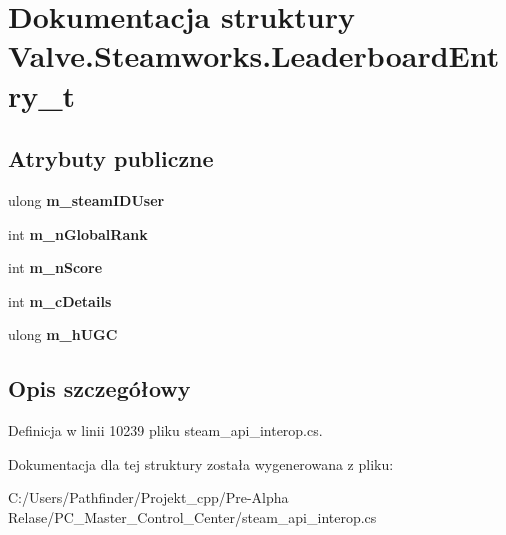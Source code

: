 \hypertarget{struct_valve_1_1_steamworks_1_1_leaderboard_entry__t}{}\section{Dokumentacja struktury Valve.\+Steamworks.\+Leaderboard\+Entry\+\_\+t}
\label{struct_valve_1_1_steamworks_1_1_leaderboard_entry__t}
\subsection*{Atrybuty publiczne}
\begin{DoxyCompactItemize}
\item 
\mbox{\label{struct_valve_1_1_steamworks_1_1_leaderboard_entry__t_a521bb9e594ff1fe1141b824491a4f9cb}} 
ulong {\bfseries m\+\_\+steam\+I\+D\+User}
\item 
\mbox{\label{struct_valve_1_1_steamworks_1_1_leaderboard_entry__t_ad04b93afef6f0ae37bd0157545af89a0}} 
int {\bfseries m\+\_\+n\+Global\+Rank}
\item 
\mbox{\label{struct_valve_1_1_steamworks_1_1_leaderboard_entry__t_ac03cf725a162adf80d652e185340232f}} 
int {\bfseries m\+\_\+n\+Score}
\item 
\mbox{\label{struct_valve_1_1_steamworks_1_1_leaderboard_entry__t_a3571ff22e52c901b3ffbb34a105fd2d4}} 
int {\bfseries m\+\_\+c\+Details}
\item 
\mbox{\label{struct_valve_1_1_steamworks_1_1_leaderboard_entry__t_a9fea26d7914276cc870626ae8fe3d313}} 
ulong {\bfseries m\+\_\+h\+U\+GC}
\end{DoxyCompactItemize}


\subsection{Opis szczegółowy}


Definicja w linii 10239 pliku steam\+\_\+api\+\_\+interop.\+cs.



Dokumentacja dla tej struktury została wygenerowana z pliku\+:\begin{DoxyCompactItemize}
\item 
C\+:/\+Users/\+Pathfinder/\+Projekt\+\_\+cpp/\+Pre-\/\+Alpha Relase/\+P\+C\+\_\+\+Master\+\_\+\+Control\+\_\+\+Center/steam\+\_\+api\+\_\+interop.\+cs\end{DoxyCompactItemize}
